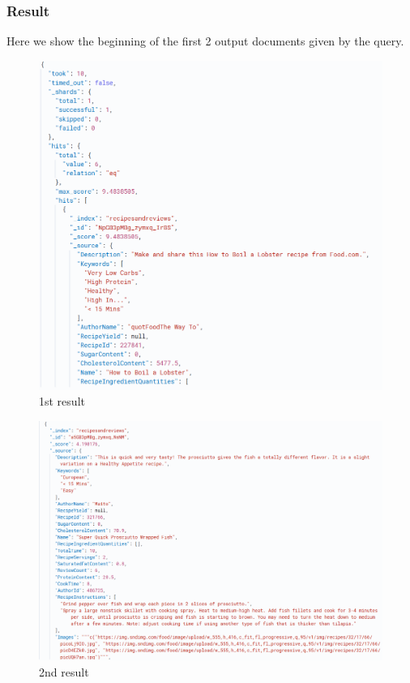 \begin{enumerate}
    \subsubsection{Result}
    Here we show the beginning of the first 2 output documents given by the query. 
    \begin{figure}[H]
    \centering
    \includegraphics[width=0.8\linewidth]{Report/ReportLatex/Images/ElasticsearchResults/proteins1.png}
    \caption{1st result}
    \label{fig:enter-label}
    \end{figure}
    \begin{figure}[H]
    \centering
    \includegraphics[width=0.8\linewidth]{Report/ReportLatex/Images/ElasticsearchResults/proteins2.png}
    \caption{2nd result}
    \label{fig:enter-label}
    \end{figure}
    
    \clearpage
    

\end{enumerate}
